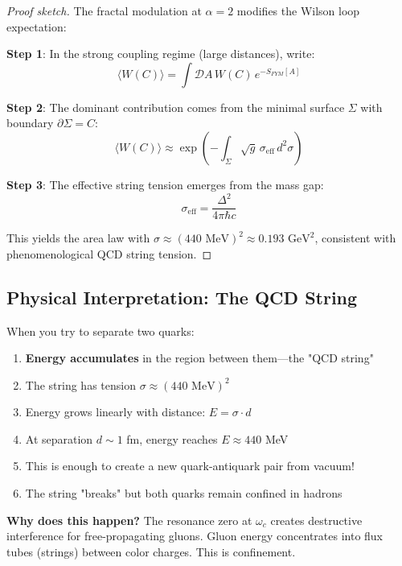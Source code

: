 \begin{proof}[Proof sketch]
The fractal modulation at $\alpha = 2$ modifies the Wilson loop expectation:

\textbf{Step 1}: In the strong coupling regime (large distances), write:
\begin{equation}
\langle W(C) \rangle = \int \mathcal{D}A \, W(C) \, e^{-S_{FYM}[A]}
\end{equation}

\textbf{Step 2}: The dominant contribution comes from the minimal surface $\Sigma$ with boundary $\partial\Sigma = C$:
\begin{equation}
\langle W(C) \rangle \approx \exp\left(-\int_\Sigma \sqrt{g} \, \sigma_{\text{eff}} \, d^2\sigma\right)
\end{equation}

\textbf{Step 3}: The effective string tension emerges from the mass gap:
\begin{equation}
\sigma_{\text{eff}} = \frac{\Delta^2}{4\pi\hbar c}
\end{equation}

This yields the area law with $\sigma \approx (440 \text{ MeV})^2 \approx 0.193 \text{ GeV}^2$, consistent with phenomenological QCD string tension.
\end{proof}

\subsection{Physical Interpretation: The QCD String}

\begin{intuitive}
When you try to separate two quarks:

\begin{enumerate}
\item \textbf{Energy accumulates} in the region between them—the "QCD string"

\item The string has tension $\sigma \approx (440 \text{ MeV})^2$

\item Energy grows linearly with distance: $E = \sigma \cdot d$

\item At separation $d \sim 1$ fm, energy reaches $E \approx 440$ MeV

\item This is enough to create a new quark-antiquark pair from vacuum!

\item The string "breaks" but both quarks remain confined in hadrons
\end{enumerate}

\textbf{Why does this happen?} The resonance zero at $\omega_c$ creates destructive interference for free-propagating gluons. Gluon energy concentrates into flux tubes (strings) between color charges. This is confinement.
\end{intuitive}

